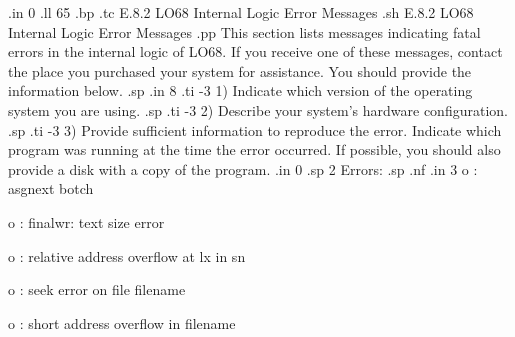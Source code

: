 .in 0
.ll 65
.bp
.tc         E.8.2  LO68 Internal Logic Error Messages
.sh
E.8.2  LO68 Internal Logic Error Messages
.pp
This section lists messages indicating fatal errors in the internal 
logic of LO68.  If you receive one of these messages, contact the place you 
purchased your system for assistance.  You should provide the information 
below.
.sp
.in 8
.ti -3
1) Indicate which version of the operating system you are using.
.sp
.ti -3
2) Describe your system's hardware configuration.
.sp
.ti -3
3) Provide sufficient information to reproduce the error.  Indicate 
which program was running at the time the error occurred.  If possible, 
you should also provide a disk with a copy of the program.
.in 0
.sp 2
Errors:
.sp
.nf
.in 3
o : asgnext botch

o : finalwr: text size error

o : relative address overflow at lx in sn

o : seek error on file  filename

o : short address overflow in  filename

